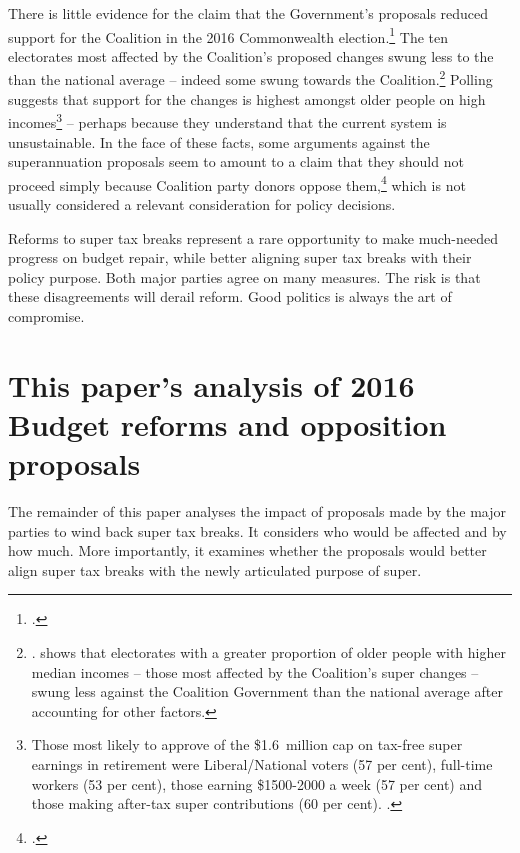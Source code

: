 \documentclass[continuous]{grattan}\usepackage[]{graphicx}\usepackage[]{color}
\begin{document}
There is little evidence for the claim that the Government's proposals reduced support for the Coalition in the 2016 Commonwealth election.\footcite{ABC-Lib-campaign-failed-to-resonate-Abetz-sez} %
The ten electorates most affected by the Coalition’s proposed changes swung less to the \ALP{} than the national average – indeed some swung towards the Coalition.\footnote{\textcite{Mather-Evidence-lacking-of-voter-backlash-super-changes}. \textcite{Pollbludger-Election2016-post-mortem} shows that electorates with a greater proportion of older people with higher median incomes – those most affected by the Coalition’s super changes – swung less against the Coalition Government than the national average after accounting for other factors.} %
Polling suggests that support for the changes is highest amongst older people on high incomes\footnote{Those most likely to approve of the \$1.6~million cap on tax-free super earnings in retirement were Liberal/National voters (57 per cent), full-time workers (53 per cent), those earning \$1500-2000 a week (57 per cent) and those making after-tax super contributions (60 per cent). \textcite{EssentialMedia-June2016}.}  – perhaps because they understand that the current system is unsustainable. 
In the face of these facts, some arguments against the superannuation proposals seem to amount to a claim that they should not proceed simply because Coalition party donors oppose them,\footcite{theOz-Morrison-super-policy-alienated-Libs} %
which is not usually considered a relevant consideration for policy decisions. 

Reforms to super tax breaks represent a rare opportunity to make much-needed progress on budget repair, while better aligning super tax breaks with their policy purpose. 
Both major parties agree on many measures. 
The risk is that these disagreements will derail reform. 
Good politics is always the art of compromise. 

\section{This paper's analysis of 2016 Budget reforms and opposition proposals}\label{this-papers-analysis-of-2016-budget-reforms}

The remainder of this paper analyses the impact of proposals made by the major parties to wind back super tax breaks. 
It considers who would be affected and by how much.
More importantly, it examines whether the proposals would better align super tax breaks with the newly articulated purpose of super.
\end{document}
